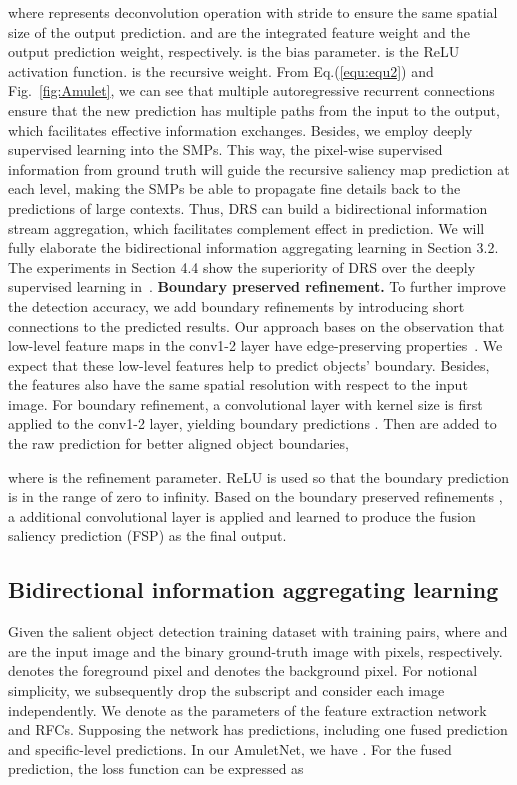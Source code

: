 \documentclass[10pt,twocolumn,letterpaper]{article}
\begin{document}
where  represents deconvolution operation with stride  to ensure the same spatial size of the output prediction.
 and  are the integrated feature weight and the output prediction weight, respectively.
 is the bias parameter.
 is the ReLU activation function.
 is the recursive weight.
From Eq.(\ref{equ:equ2}) and Fig.~\ref{fig:Amulet}, we can see that multiple autoregressive recurrent connections
ensure that the new prediction has multiple paths from the input to the output, which facilitates effective information exchanges.
Besides, we employ deeply supervised learning into the SMPs.
This way, the pixel-wise supervised information from ground truth will guide the recursive saliency map prediction at each level, making the SMPs be able to propagate fine details back to the predictions of large contexts.
Thus, DRS can build a bidirectional information stream aggregation, which facilitates complement effect in prediction.
We will fully elaborate the bidirectional information aggregating learning in Section 3.2.
The experiments in Section 4.4 show the superiority of DRS over the deeply supervised learning in~\cite{xie2015holistically}.
\vspace{-5mm}
{\flushleft\textbf{Boundary preserved refinement.}}
To further improve the detection accuracy, we add boundary refinements by introducing short connections to the predicted results.
Our approach bases on the observation that low-level feature maps in the conv1-2 layer have edge-preserving properties~\cite{zeiler2014visualizing,mahendran2015understanding}.
We expect that these low-level features help to predict objects' boundary.
Besides, the features also have the same spatial resolution with respect to the input image.
For boundary refinement, a convolutional layer with  kernel size is first applied to the conv1-2 layer, yielding
boundary predictions .
Then  are added to the raw prediction for better aligned object boundaries,

where  is the refinement parameter.
ReLU is used so that the boundary prediction is in the range of zero to infinity.
Based on the boundary preserved refinements , a additional convolutional layer is applied and learned to produce the fusion saliency prediction (FSP) as the final output.
\subsection{Bidirectional information aggregating learning}
Given the salient object detection training dataset  with  training pairs, where  and  are the input image and the binary ground-truth image with  pixels, respectively.
 denotes the foreground pixel and  denotes the background pixel.
For notional simplicity, we subsequently drop the subscript  and consider each image independently.
We denote  as the parameters of the feature extraction network and RFCs.
Supposing the network has  predictions, including one fused prediction and  specific-level predictions. In our AmuletNet, we have .
For the fused prediction, the loss function can be expressed as
\end{document}
